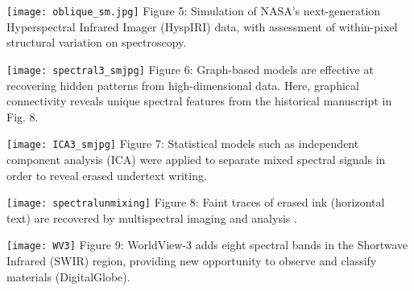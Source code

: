 \documentclass[letterpaper,sans]{moderncv}
\begin{document}
\begin{paracol}{2}
\begin{rightcolumn}
    \texttt{[image: oblique\_sm.jpg]}
Figure 5: Simulation of NASA's next-generation Hyperspectral Infrared Imager (HyspIRI) data, with assessment of within-pixel structural variation on spectroscopy.
\newline

    \texttt{[image: spectral3\_smjpg]}
Figure 6: Graph-based models are effective at recovering hidden patterns from high-dimensional data. Here, graphical connectivity reveals unique spectral features from the historical manuscript in Fig. 8.
\newline


    \texttt{[image: ICA3\_smjpg]}
Figure 7: Statistical models such as independent component analysis (ICA) were applied to separate mixed spectral signals in order to reveal erased undertext writing.  
\newline

    \texttt{[image: spectralunmixing]}
Figure 8:  Faint traces of erased ink (horizontal text) are recovered by multispectral imaging and analysis \cite{easton2013statistical}. 
\newline
\vspace{1cm}
  
  \texttt{[image: WV3]}
Figure 9: WorldView-3 adds eight spectral bands in the Shortwave Infrared (SWIR) region, providing new opportunity to observe and classify materials (DigitalGlobe).


\end{rightcolumn}
\end{paracol}
\printbibliography
\end{document}
